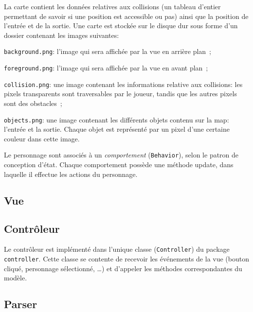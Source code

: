 \documentclass[a4paper,12pt]{article}
\begin{document}
La carte contient les données relatives aux collisions (un
tableau d'entier permettant de savoir si une position est
accessible ou pas) ainsi que la position de l'entrée et de
la sortie. Une carte est stockée sur le disque dur sous
forme d'un dossier contenant les images suivantes:
\begin{list}{-}{}
  \item \texttt{background.png}: l'image qui sera affichée
par la vue en arrière plan~;
  \item \texttt{foreground.png}: l'image qui sera affichée
par la vue en avant plan~;
  \item \texttt{collision.png}: une image contenant les
informations relative aux collisions: les pixels
transparents sont traversables par le joueur, tandis que les
autres pixels sont des obstacles~;
  \item \texttt{objects.png}: une image contenant les
différents objets contenu sur la map: l'entrée et la sortie.
Chaque objet est représenté par un pixel d'une certaine
couleur dans cette image.
\end{list}

Le personnage sont associés à un \emph{comportement}
(\texttt{Behavior}), selon le patron de conception d'état.
Chaque comportement possède une méthode update, dans
laquelle il effectue les actions du personnage.


\subsection{Vue}

\subsection{Contrôleur}
Le contrôleur est implémenté dans l'unique classe
(\texttt{Controller}) du package \texttt{controller}. Cette
classe se contente de recevoir les événements de la vue
(bouton cliqué, personnage sélectionné, \dots) et d'appeler
les méthodes correspondantes du modèle.

\subsection{Parser}
\end{document}
